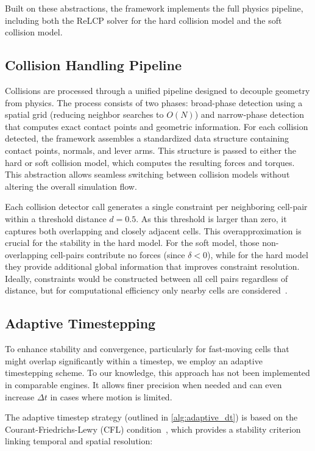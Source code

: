 \documentclass[conference]{IEEEtran}
\begin{document}
Built on these abstractions, the framework implements the full physics pipeline, including both the ReLCP solver for the hard collision model and the soft collision model.

\subsection{Collision Handling Pipeline}

Collisions are processed through a unified pipeline designed to decouple geometry from physics. The process consists of two phases: broad-phase detection using a spatial grid (reducing neighbor searches to $O(N)$) and narrow-phase detection that computes exact contact points and geometric information. For each collision detected, the framework assembles a standardized data structure containing contact points, normals, and lever arms. This structure is passed to either the hard or soft collision model, which computes the resulting forces and torques. This abstraction allows seamless switching between collision models without altering the overall simulation flow.

Each collision detector call generates a single constraint per neighboring cell-pair within a threshold distance $d = 0.5$. As this threshold is larger than zero, it captures both overlapping and closely adjacent cells. This overapproximation is crucial for the stability in the hard model. For the soft model, those non-overlapping cell-pairs contribute no forces (since $\delta < 0$), while for the hard model they provide additional global information that improves constraint resolution. Ideally, constraints would be constructed between all cell pairs regardless of distance, but for computational efficiency only nearby cells are considered~\cite{Yan2019, Yan2022}.

\subsection{Adaptive Timestepping}

To enhance stability and convergence, particularly for fast-moving cells that might overlap significantly within a timestep, we employ an adaptive timestepping scheme. To our knowledge, this approach has not been implemented in comparable engines. It allows finer precision when needed and can even increase $\Delta t$ in cases where motion is limited.

The adaptive timestep strategy (outlined in \autoref{alg:adaptive_dt}) is based on the Courant-Friedrichs-Lewy (CFL) condition~\cite{Courant1928}, which provides a stability criterion linking temporal and spatial resolution:
\end{document}
